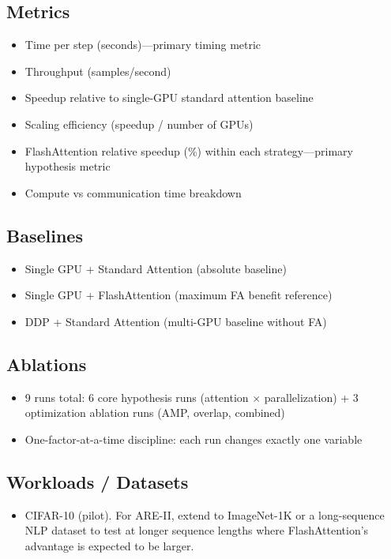 \documentclass[12pt, a4paper]{article}
\begin{document}
\subsection{Metrics}
\begin{itemize}
    \item Time per step (seconds)---primary timing metric
    \item Throughput (samples/second)
    \item Speedup relative to single-GPU standard attention baseline
    \item Scaling efficiency (speedup / number of GPUs)
    \item FlashAttention relative speedup (\%) within each strategy---primary hypothesis metric
    \item Compute vs communication time breakdown
\end{itemize}

\subsection{Baselines}
\begin{itemize}
    \item Single GPU + Standard Attention (absolute baseline)
    \item Single GPU + FlashAttention (maximum FA benefit reference)
    \item DDP + Standard Attention (multi-GPU baseline without FA)
\end{itemize}

\subsection{Ablations}
\begin{itemize}
    \item 9 runs total: 6 core hypothesis runs (attention $\times$ parallelization) + 3 optimization ablation runs (AMP, overlap, combined)
    \item One-factor-at-a-time discipline: each run changes exactly one variable
\end{itemize}

\subsection{Workloads / Datasets}
\begin{itemize}
    \item CIFAR-10 (pilot). For ARE-II, extend to ImageNet-1K or a long-sequence NLP dataset to test at longer sequence lengths where FlashAttention's advantage is expected to be larger.
\end{itemize}
\end{document}
